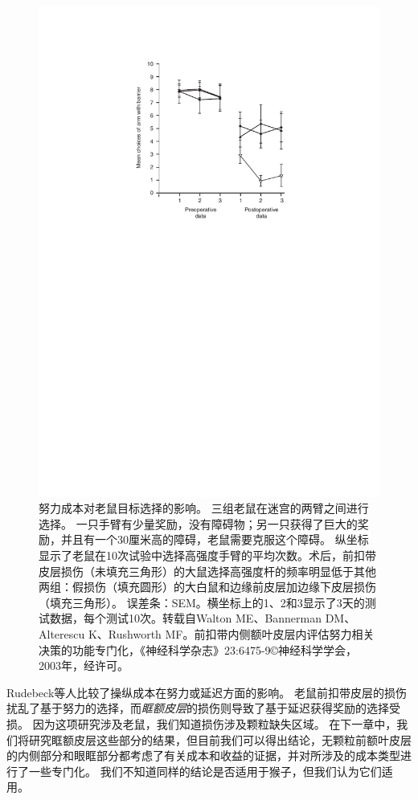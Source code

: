 \begin{figure}[!htb]
	\centering
	\includegraphics{chap3/3_7}
	\caption{努力成本对老鼠目标选择的影响。
		三组老鼠在迷宫的两臂之间进行选择。
		一只手臂有少量奖励，没有障碍物；另一只获得了巨大的奖励，并且有一个30厘米高的障碍，老鼠需要克服这个障碍。
		纵坐标显示了老鼠在10次试验中选择高强度手臂的平均次数。术后，前扣带皮层损伤（未填充三角形）的大鼠选择高强度杆的频率明显低于其他两组：假损伤（填充圆形）的大白鼠和边缘前皮层加边缘下皮层损伤（填充三角形）。
		误差条：SEM。横坐标上的1、2和3显示了3天的测试数据，每个测试10次。转载自Walton ME、Bannerman DM、Alterescu K、Rushworth MF。前扣带内侧额叶皮层内评估努力相关决策的功能专门化，《神经科学杂志》23:6475-9©神经科学学会，2003年，经许可。}
	\label{fig:3_7}
\end{figure}


Rudebeck等人\cite{rudebeck2006separate}比较了操纵成本在努力或延迟方面的影响。
老鼠前扣带皮层的损伤扰乱了基于努力的选择，而\textit{眶额皮层}的损伤则导致了基于延迟获得奖励的选择受损。
因为这项研究涉及老鼠，我们知道损伤涉及颗粒缺失区域。
在下一章中，我们将研究眶额皮层这些部分的结果，但目前我们可以得出结论，无颗粒前额叶皮层的内侧部分和眼眶部分都考虑了有关成本和收益的证据，并对所涉及的成本类型进行了一些专门化。
我们不知道同样的结论是否适用于猴子，但我们认为它们适用。\par


